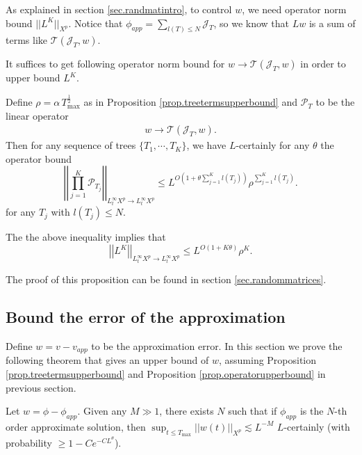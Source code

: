 As explained in section \ref{sec.randmatintro}, to control $w$, we need operator norm bound $||L^K||_{X^p}$. Notice that $\phi_{app}=\sum_{l(T)\le N} \mathcal{J}_T$, so we know that $Lw$ is a sum of terms like $\mathcal{T}(\mathcal{J}_{T},w)$.

It suffices to get following operator norm bound for $w\rightarrow \mathcal{T}(\mathcal{J}_{T},w)$ in order to upper bound $L^K$.

\begin{prop}\label{prop.operatorupperbound}
Define $\rho=\alpha\, T^{\frac{1}{2}}_{\text{max}}$ as in Proposition \ref{prop.treetermsupperbound} and $\mathcal{P}_{T}$ to be the linear operator
\begin{equation}
\begin{split}
    w\rightarrow \mathcal{T}(\mathcal{J}_{T},w).
\end{split}
\end{equation} 
Then for any sequence of trees $\{T_1,\cdots,T_K\}$, we have $L$-certainly for any $\theta$ the operator bound
\begin{equation}\label{eq.operatornorm'.threewave}
    \left|\left|\prod_{j=1}^K\mathcal{P}_{T_j}\right|\right|_{L_t^{\infty}X^p\rightarrow L_t^{\infty}X^p}\le L^{O\left(1+\theta\sum_{j=1}^K l(T_j)\right)} \rho^{\sum_{j=1}^K l(T_j)}.
\end{equation}
for any $T_j$ with $l(T_j)\le N$. 

The the above inequality implies that 
\begin{equation}\label{eq.operatornorm.threewave}
    \left|\left|L^K\right|\right|_{L_t^{\infty}X^p\rightarrow L_t^{\infty}X^p}\le L^{O(1+K\theta)} \rho^{K}.
\end{equation}
\end{prop}

The proof of this proposition can be found in section \ref{sec.randommatrices}.
\subsection{Bound the error of the approximation}\label{sec.errorw}

Define $w=v-v_{app}$ to be the approximation error. In this section we prove the following theorem that gives an upper bound of $w$, assuming Proposition \ref{prop.treetermsupperbound} and Proposition \ref{prop.operatorupperbound} in previous section.


\begin{thm}\label{th.app}
Let $w=\phi-\phi_{app}$. Given any $M\gg 1$, there exists $N$ such that if $\phi_{app}$ is the $N$-th order approximate solution, then $\sup_{t\le T_{\text{max}}}||w(t)||_{X^p}\lesssim L^{-M}$ $L$-certainly (with probability $\geq 1-Ce^{-CL^\theta}$).
\end{thm}

